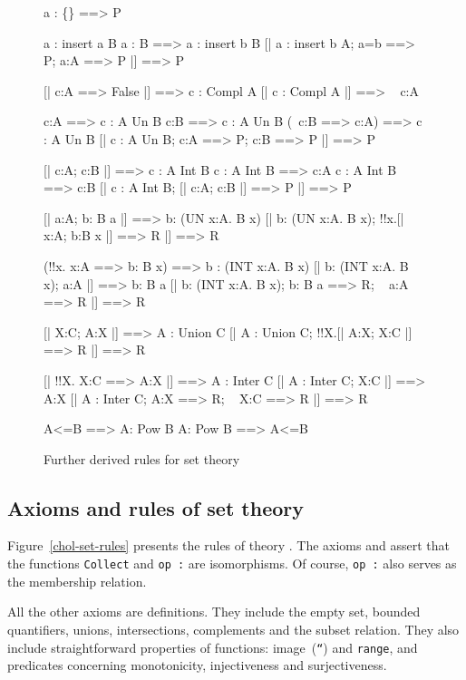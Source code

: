 \begin{figure} \underscoreon
\begin{ttbox}
   a : \{\} ==> P

 a : insert a B
 a : B ==> a : insert b B
  [| a : insert b A;  a=b ==> P;  a:A ==> P |] ==> P

   [| c:A ==> False |] ==> c : Compl A
   [| c : Compl A |] ==> ~ c:A

     c:A ==> c : A Un B
     c:B ==> c : A Un B
     (~c:B ==> c:A) ==> c : A Un B
      [| c : A Un B;  c:A ==> P;  c:B ==> P |] ==> P

     [| c:A;  c:B |] ==> c : A Int B
    c : A Int B ==> c:A
    c : A Int B ==> c:B
     [| c : A Int B;  [| c:A; c:B |] ==> P |] ==> P

     [| a:A;  b: B a |] ==> b: (UN x:A. B x)
     [| b: (UN x:A. B x);  !!x.[| x:A;  b:B x |] ==> R |] ==> R

    (!!x. x:A ==> b: B x) ==> b : (INT x:A. B x)
    [| b: (INT x:A. B x);  a:A |] ==> b: B a
    [| b: (INT x:A. B x);  b: B a ==> R;  ~ a:A ==> R |] ==> R

   [| X:C;  A:X |] ==> A : Union C
   [| A : Union C;  !!X.[| A:X;  X:C |] ==> R |] ==> R

   [| !!X. X:C ==> A:X |] ==> A : Inter C
   [| A : Inter C;  X:C |] ==> A:X
   [| A : Inter C;  A:X ==> R;  ~ X:C ==> R |] ==> R

     A<=B ==> A: Pow B
     A: Pow B ==> A<=B
\end{ttbox}
\caption{Further derived rules for set theory} \label{chol-set2}
\end{figure}


\subsection{Axioms and rules of set theory}
Figure~\ref{chol-set-rules} presents the rules of theory .  The
axioms  and  assert
that the functions {\tt Collect} and \hbox{\tt op :} are isomorphisms.  Of
course, \hbox{\tt op :} also serves as the membership relation.

All the other axioms are definitions.  They include the empty set, bounded
quantifiers, unions, intersections, complements and the subset relation.
They also include straightforward properties of functions: image~({\tt``}) and
{\tt range}, and predicates concerning monotonicity, injectiveness and
surjectiveness.  

